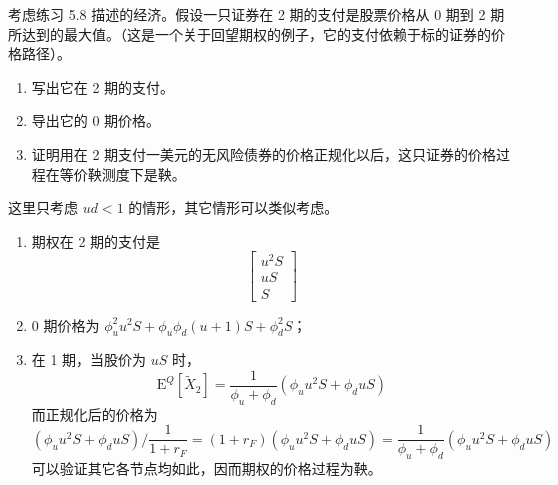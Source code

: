 \begin{problem}
 考虑练习 5.8 描述的经济。假设一只证券在 2 期的支付是股票价格从 0 期到 2 期所达到的最大值。（这是一个关于回望期权的例子，它的支付依赖于标的证券的价格路径）。
\begin{enumerate}[label=(\alph*)]
    \item 写出它在 2 期的支付。
    \item 导出它的 0 期价格。
    \item 证明用在 2 期支付一美元的无风险债券的价格正规化以后，这只证券的价格过程在等价鞅测度下是鞅。
\end{enumerate}
\end{problem}
\begin{solution}
这里只考虑 $ud<1$ 的情形，其它情形可以类似考虑。
\begin{enumerate}[label=(\alph*)]
    \item 期权在 2 期的支付是
    \[
        \begin{bmatrix}u^{2}S\\uS\\S\end{bmatrix}
    \]
    \item 0 期价格为 $\phi_{u}^{2}u^{2}S+\phi_{u}\phi_{d}(u+1)S+\phi_{d}^{2}S$；
    \item 在 1 期，当股价为 $uS$ 时，
    \[
        \mathrm{E}^{Q}[\tilde{X}_{2}]=\frac{1}{\phi_{u}+\phi_{d}}(\phi_{u}u^{2}S+\phi_{d}uS)
    \]
    而正规化后的价格为
    \[
        (\phi_{u}u^{2}S+\phi_{d}uS)\Big/\frac{1}{1+r_{F}}=(1+r_{F})(\phi_{u}u^{2}S+\phi_{d}uS)=\frac{1}{\phi_{u}+\phi_{d}}(\phi_{u}u^{2}S+\phi_{d}uS)
    \]
    可以验证其它各节点均如此，因而期权的价格过程为鞅。
\end{enumerate}
\end{solution}

